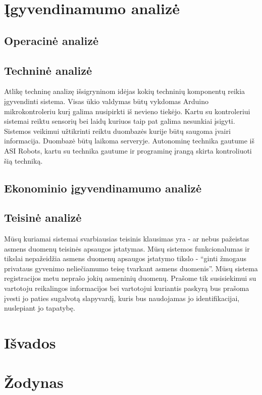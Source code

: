 \documentclass[oneside]{VUMIFPSkursinis}
\begin{document}
\section{Įgyvendinamumo analizė}
	\subsection{Operacinė analizė}
	\subsection{Techninė analizė}
Atlikę techninę analizę išsigryninom idėjas kokių techninių komponentų reikia įgyvendinti sistema. Visas ūkio valdymas būtų vykdomas Arduino mikrokontroleriu kurį galima nusipirkti iš nevieno tiekėjo. Kartu su kontroleriui sistemai reiktu sensorių bei laidų kuriuos taip pat galima nesunkiai įsigyti. Sistemos veikimui užtikrinti reiktu duombazės kurije būtų saugoma įvairi informacija. Duombazė būtų laikoma serveryje. Autonominę technika gautume iš ASI Robots, kartu su technika gautume ir programinę įrangą skirta kontroliuoti šią techniką.
	\subsection{Ekonominio įgyvendinamumo analizė}
	\subsection{Teisinė analizė}
Mūsų kuriamai sistemai svarbiausias teisinis klausimas yra - ar nebus pažeistas asmens duomenų teisinės apsaugos įstatymas. Mūsų sistemos funkcionalumas ir tikslai nepažeidžia asmens duomenų apsaugos įstatymo tikslo - “ginti žmogaus privataus gyvenimo neliečiamumo teisę tvarkant asmens duomenis”. Mūsų sistema registracijos metu neprašo jokių asmeninių duomenų. Prašome tik susisiekimui su vartotoju reikalingos informacijos bei vartotojui kuriantis paskyrą bus prašoma įvesti jo paties sugalvotą slapyvardį, kuris bus naudojamas jo identifikacijai, nuslepiant jo tapatybę.
\section{Išvados}
\section{Žodynas}
\end{document}
